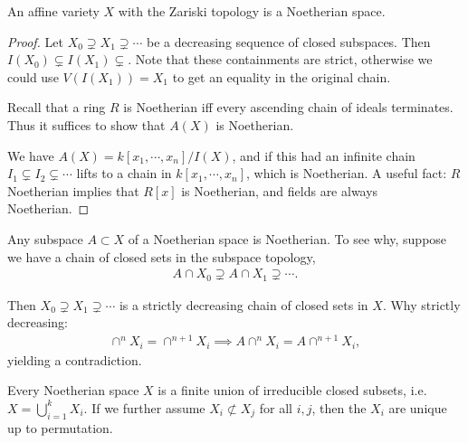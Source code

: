 \begin{proposition}[?]

An affine variety \(X\) with the Zariski topology is a Noetherian space.

\end{proposition}

\begin{proof}

Let \(X_0 \supsetneq X_1 \supsetneq \cdots\) be a decreasing sequence of
closed subspaces. Then \(I(X_0) \subsetneq I(X_1) \subsetneq\). Note
that these containments are strict, otherwise we could use
\(V(I(X_1)) = X_1\) to get an equality in the original chain.

Recall that a ring \(R\) is Noetherian iff every ascending chain of
ideals terminates. Thus it suffices to show that \(A(X)\) is Noetherian.

We have \(A(X) = k[x_1, \cdots, x_{n}] / I(X)\), and if this had an
infinite chain \(I_1 \subsetneq I_2 \subsetneq \cdots\) lifts to a chain
in \(k[x_1, \cdots, x_{n}]\), which is Noetherian. A useful fact: \(R\)
Noetherian implies that \(R[x]\) is Noetherian, and fields are always
Noetherian.

\end{proof}

\begin{remark}

Any subspace \(A\subset X\) of a Noetherian space is Noetherian. To see
why, suppose we have a chain of closed sets in the subspace topology,
\begin{align*}  
A\cap X_0 \supsetneq A\cap X_1 \supsetneq \cdots
.\end{align*}

Then \(X_0 \supsetneq X_1 \supsetneq \cdots\) is a strictly decreasing
chain of closed sets in \(X\). Why strictly decreasing:
\begin{align*}
\cap^n X_i = \cap^{n+1} X_i \implies A\cap^n X_i = A\cap^{n+1} X_i
,\end{align*}
yielding a contradiction.

\end{remark}

\begin{proposition}

Every Noetherian space \(X\) is a finite union of irreducible closed
subsets, i.e.~\(X = \bigcup_{i=1}^k X_i\). If we further assume
\(X_i \not\subset X_j\) for all \(i, j\), then the \(X_i\) are unique up
to permutation.

\end{proposition}

